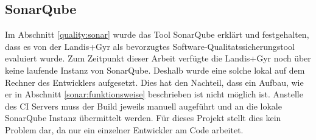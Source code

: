 \subsection{SonarQube}\label{s6:sonar}
Im Abschnitt \ref{quality:sonar} wurde das Tool SonarQube erklärt und festgehalten, dass es von der Landis+Gyr als bevorzugtes Software-Qualitatssicherungstool evaluiert wurde.
Zum Zeitpunkt dieser Arbeit verfügte die Landis+Gyr noch über keine laufende Instanz von SonarQube.
Deshalb wurde eine solche lokal auf dem Rechner des Entwicklers aufgesetzt.
Dies hat den Nachteil, dass ein Aufbau, wie er in Abschnitt \ref{sonar:funktionsweise} beschrieben ist nicht möglich ist.
Anstelle des \ac{CI} Servers muss der Build jeweils manuell augeführt und an die lokale SonarQube Instanz übermittelt werden.
Für dieses Projekt stellt dies kein Problem dar, da nur ein einzelner Entwickler am Code arbeitet.



